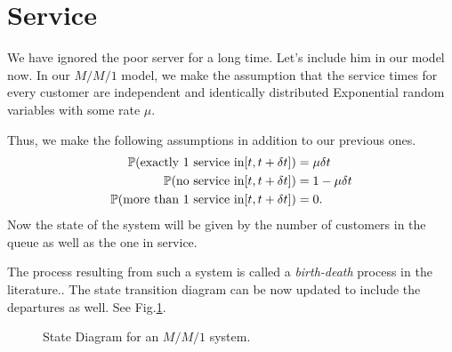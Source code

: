 \documentclass[11pt, a4paper]{report}
\begin{document}
\section{Service}
We have ignored the poor server for a long time. Let's include him in our model now. In our $M/M/1$ model, we make the assumption that the service times for every customer are independent and identically distributed Exponential random variables with some rate $\mu$.

Thus, we make the following assumptions in addition to our previous ones.
\begin{subequations}
    \begin{align}
        {\mathbb{P}}(\text{exactly 1 service in} [t, t+\delta t]) &= \mu \delta t \\
        {\mathbb{P}}(\text{no service in} [t, t+\delta t]) &= 1 - \mu \delta t  \\
        {\mathbb{P}}(\text{more than 1 service in} [t, t+\delta t]) &= 0.  
    \end{align}    
    \label{eq:assumDep}
\end{subequations}
Now the state of the system will be given by the number of customers in the queue as well as the one in service. 

The process resulting from such a system is called a \emph{birth-death} process in the literature.\cite{RobertazziQ, myReference}. The state transition diagram can be now updated to include the departures as well. See Fig.\ref{fig:mm1_std}. 
\begin{figure}
    \centering
    
    \caption{State Diagram for an $M/M/1$ system.}
    \label{fig:mm1_std}
\end{figure}
\end{document}
